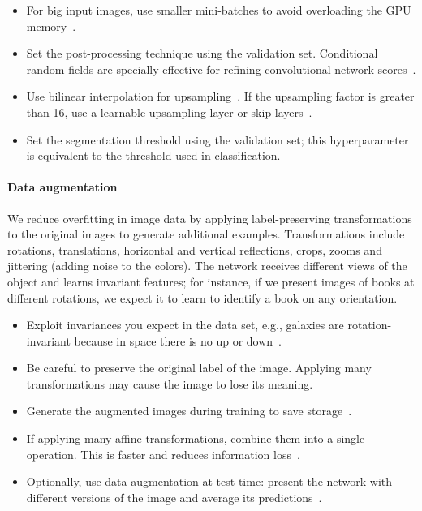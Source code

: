 \begin{itemize}
	\item For big input images, use smaller mini-batches to avoid overloading the GPU memory~\cite{Karpathy2016}.

	\item Set the post-processing technique using the validation set. Conditional random fields are specially effective for refining convolutional network scores~\cite{Chen2015}.

	\item Use bilinear interpolation for upsampling~\cite{Chen2015}. If the upsampling factor is greater than 16, use a learnable upsampling layer or skip layers~\cite{Long2015}.

	\item Set the segmentation threshold using the validation set; this hyperparameter is equivalent to the threshold used in classification.
\end{itemize}

\paragraph{Data augmentation} We reduce overfitting in image data by applying label-preserving transformations to the original images to generate additional examples. Transformations include rotations, translations, horizontal and vertical reflections, crops, zooms and jittering (adding noise to the colors).  The network receives different views of the object and learns invariant features; for instance, if we present images of books at different rotations, we expect it to learn to identify a book on any orientation.

\begin{itemize}
	\item Exploit invariances you expect in the data set, e.g., galaxies are rotation-invariant because in space there is no up or down~\cite{Dieleman2015}.%

	\item Be careful to preserve the original label of the image. Applying many transformations may cause the image to lose its meaning. 

	\item Generate the augmented images during training to save storage~\cite{Krizhevsky2012}.

	\item If applying many affine transformations, combine them into a single operation. This is faster and reduces information loss~\cite{Dieleman2015}.

	\item Optionally, use data augmentation at test time: present the network with different versions of the image and average its predictions~\cite{Krizhevsky2012}.
\end{itemize}

